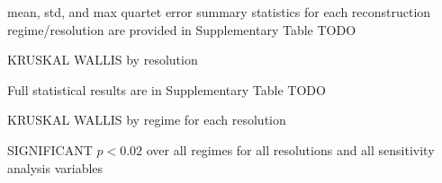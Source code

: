 mean, std, and max quartet error summary statistics for each reconstruction regime/resolution are provided in Supplementary Table TODO


KRUSKAL WALLIS by resolution
%
%
%

Full statistical results are in Supplementary Table TODO

KRUSKAL WALLIS by regime for each resolution

SIGNIFICANT $p < 0.02$ over all regimes for all resolutions and all sensitivity analysis variables
